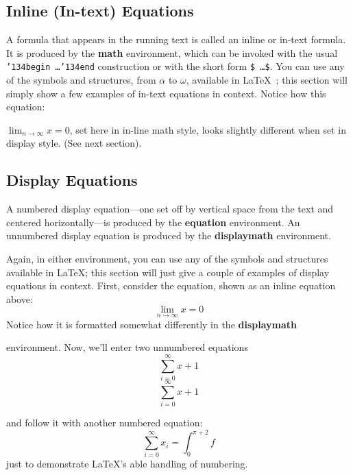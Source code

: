 \documentclass[sigconf]{acmart}
\begin{document}
\subsection{Inline (In-text) Equations}
A formula that appears in the running text is called an
inline or in-text formula.  It is produced by the
\textbf{math} environment, which can be
invoked with the usual \texttt{{\char'134}begin\,\ldots{\char'134}end}
construction or with the short form \texttt{\$\,\ldots\$}. You
can use any of the symbols and structures,
from $\alpha$ to $\omega$, available in
\LaTeX~\cite{Lamport:LaTeX}; this section will simply show a
few examples of in-text equations in context. Notice how
this equation:

\begin{math}
  \lim_{n\rightarrow \infty}x=0
\end{math},
set here in in-line math style, looks slightly different when
set in display style.  (See next section).

\subsection{Display Equations}
A numbered display equation---one set off by vertical space from the
text and centered horizontally---is produced by the \textbf{equation}
environment. An unnumbered display equation is produced by the
\textbf{displaymath} environment.

Again, in either environment, you can use any of the symbols
and structures available in \LaTeX\@; this section will just
give a couple of examples of display equations in context.
First, consider the equation, shown as an inline equation above:
\begin{equation}
  \lim_{n\rightarrow \infty}x=0
\end{equation}
Notice how it is formatted somewhat differently in
the \textbf{displaymath}

environment.  Now, we'll enter two unnumbered equations
\begin{displaymath}
  \sum_{i=0}^{\infty} x + 1
\end{displaymath}
\begin{equation*}
  \sum_{i=0}^{\infty} x + 1
\end{equation*}

and follow it with another numbered equation:
\begin{equation}
  \sum_{i=0}^{\infty}x_i=\int_{0}^{\pi+2} f
\end{equation}
just to demonstrate \LaTeX's able handling of numbering.
\end{document}
